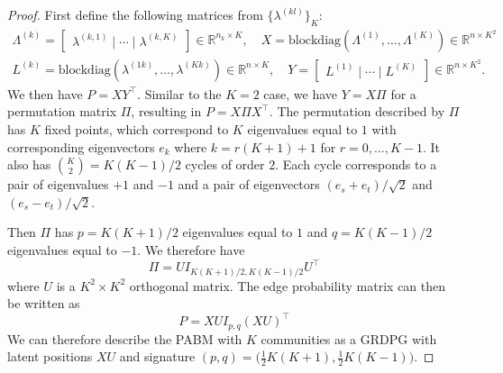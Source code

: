 \documentclass[12pt]{article}
\begin{document}
\begin{proof}
First define the following matrices from $\{\lambda^{(kl)}\}_K$:
\begin{gather}
\label{eq:xy}
\Lambda^{(k)} = \begin{bmatrix} \lambda^{(k,1)} \mid \cdots \mid \lambda^{(k, K)} \end{bmatrix}
\in \mathbb{R}^{n_k \times K}, \quad
X = \text{blockdiag}(\Lambda^{(1)}, \dots, \Lambda^{(K)}) \in
\mathbb{R}^{n \times K^2} \\
L^{(k)} = \text{blockdiag}(\lambda^{(1k)}, \dots, \lambda^{(Kk)}) \in
\mathbb{R}^{n \times K}, \quad
Y = \begin{bmatrix} L^{(1)} \mid \cdots \mid L^{(K)} \end{bmatrix} \in
\mathbb{R}^{n \times K^2}.
\end{gather}
We then have $P = X Y^\top$. Similar to the $K = 2$ case, we have $Y = X \Pi$ for a permutation matrix
$\Pi$, resulting in $P = X \Pi X^\top$.
The permutation described by $\Pi$ has $K$ fixed points, which correspond to
$K$ eigenvalues equal to $1$ with corresponding eigenvectors $e_k$ where
$k = r (K + 1) + 1$ for $r = 0, ..., K - 1$. It also has
$\binom{K}{2} = K (K - 1) / 2$ cycles of order $2$. Each cycle corresponds to
a pair of eigenvalues $+1$ and $-1$ and a pair of eigenvectors
$(e_s + e_t) / \sqrt{2}$ and $(e_s - e_t) / \sqrt{2}$.

Then $\Pi$ has $p = K (K + 1) / 2$ eigenvalues equal to $1$ and $q = K (K - 1) / 2$
eigenvalues equal to $-1$. We therefore have
\begin{equation} \label{eq:permutation}
\Pi = U I_{K (K + 1) / 2, K (K - 1) / 2} U^\top
\end{equation}
where $U$ is a $K^2 \times K^2$ orthogonal matrix. The edge probability matrix can then be written as
\begin{equation} \label{eq:pabm-grdpg}
P = X U I_{p, q} (X U)^\top
\end{equation}
We can therefore describe the PABM with $K$ communities as a GRDPG with latent
positions $X U$ and signature $(p,q) = \bigl( \tfrac{1}{2} K (K + 1) ,
\tfrac{1}{2} K (K - 1)\bigr)$.
\end{proof}
\end{document}
